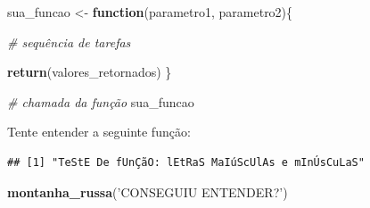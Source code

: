 \documentclass[]{book}
\newenvironment{Shaded}{\begin{snugshade}}{\end{snugshade}}
\newcommand{\KeywordTok}[1]{\textcolor[rgb]{0.13,0.29,0.53}{\textbf{#1}}}
\newcommand{\DecValTok}[1]{\textcolor[rgb]{0.00,0.00,0.81}{#1}}
\newcommand{\StringTok}[1]{\textcolor[rgb]{0.31,0.60,0.02}{#1}}
\newcommand{\CommentTok}[1]{\textcolor[rgb]{0.56,0.35,0.01}{\textit{#1}}}
\newcommand{\OtherTok}[1]{\textcolor[rgb]{0.56,0.35,0.01}{#1}}
\newcommand{\ControlFlowTok}[1]{\textcolor[rgb]{0.13,0.29,0.53}{\textbf{#1}}}
\newcommand{\OperatorTok}[1]{\textcolor[rgb]{0.81,0.36,0.00}{\textbf{#1}}}
\newcommand{\NormalTok}[1]{#1}
\begin{document}
\begin{Shaded}
\begin{Highlighting}[]
\NormalTok{sua_funcao <-}\StringTok{ }\ControlFlowTok{function}\NormalTok{(parametro1, parametro2)\{}
  
  \CommentTok{# sequência de tarefas}
  
  \KeywordTok{return}\NormalTok{(valores_retornados)}
\NormalTok{\}}

\CommentTok{# chamada da função}
\NormalTok{sua_funcao}
\end{Highlighting}
\end{Shaded}

Tente entender a seguinte função:

\begin{Shaded}
\end{Shaded}

\begin{verbatim}
## [1] "TeStE De fUnÇãO: lEtRaS MaIúScUlAs e mInÚsCuLaS"
\end{verbatim}

\begin{Shaded}
\begin{Highlighting}[]
\KeywordTok{montanha_russa}\NormalTok{(}\StringTok{'CONSEGUIU ENTENDER?'}\NormalTok{)}
\end{Highlighting}
\end{Shaded}
\end{document}
